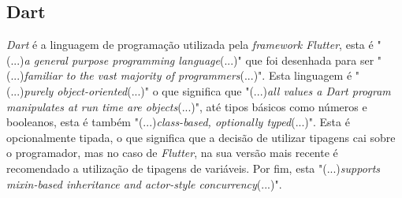 \subsection{Dart}
\textit{Dart} é a linguagem de programação utilizada pela \textit{framework Flutter}, esta é "(...)\emph{a general purpose programming language}(...)"\citep{dart_pg_lang} que foi desenhada para ser "(...)\emph{familiar to the vast majority of programmers}(...)"\citep{dart_pg_lang}. Esta linguagem é "(...)\emph{purely object-oriented}(...)" o que significa que "(...)\emph{all values a Dart program manipulates at run time are objects}(...)"\citep{dart_pg_lang}, até tipos básicos como números e booleanos, esta é também "(...)\emph{class-based, optionally typed}(...)"\citep{dart_pg_lang}. Esta é opcionalmente tipada, o que significa que a decisão de utilizar tipagens cai sobre o programador, mas no caso de \textit{Flutter}, na sua versão mais recente é recomendado a utilização de tipagens de variáveis. Por fim, esta "(...)\emph{supports mixin-based inheritance and actor-style concurrency}(...)"\citep{dart_pg_lang}.